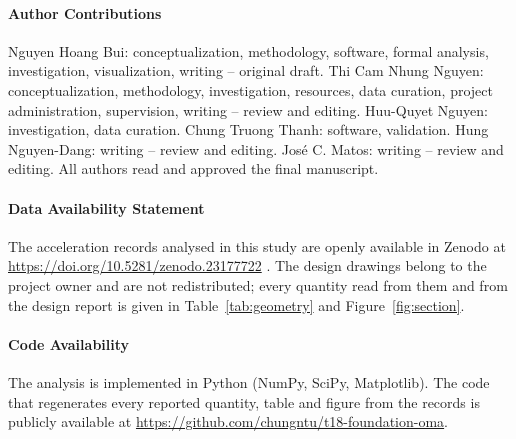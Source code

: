 \documentclass[11pt]{article}
\begin{document}
\paragraph{Author Contributions} Nguyen Hoang Bui: conceptualization, methodology, software, formal analysis, investigation, visualization, writing -- original draft. Thi Cam Nhung Nguyen: conceptualization, methodology, investigation, resources, data curation, project administration, supervision, writing -- review and editing. Huu-Quyet Nguyen: investigation, data curation. Chung Truong Thanh: software, validation. Hung Nguyen-Dang: writing -- review and editing. Jos\'e C. Matos: writing -- review and editing. All authors read and approved the final manuscript.

\paragraph{Data Availability Statement} The acceleration records analysed in this study are openly available in Zenodo at \url{https://doi.org/10.5281/zenodo.23177722} \cite{t18dataset}. The design drawings belong to the project owner and are not redistributed; every quantity read from them and from the design report is given in Table~\ref{tab:geometry} and Figure~\ref{fig:section}.

\paragraph{Code Availability} The analysis is implemented in Python (NumPy, SciPy, Matplotlib). The code that regenerates every reported quantity, table and figure from the records is publicly available at \url{https://github.com/chungntu/t18-foundation-oma}.
\end{document}
